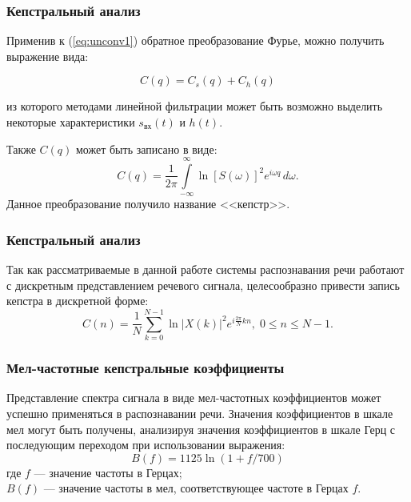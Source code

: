 \documentclass[slidestop, compress, mathserif, blackandwhite, utf8, serif, slidescentered]{beamer}
\begin{document}
\begin{frame}[plain]
	\frametitle{Кепстральный анализ}
	Применив к (\ref{eq:unconv1}) обратное преобразование Фурье, можно получить выражение вида:

	\begin{equation}
		C(q)=C_{s}(q)+C_{h}(q)
	\end{equation}

	из которого методами линейной фильтрации может быть возможно выделить некоторые характеристики $s_{\text{вх}}(t)$ и $h(t)$.

	Также $C(q)$ может быть записано в виде:
	\begin{equation}
		 C(q)={\frac{1}{2\pi}}\int\limits_{-\infty}^{\infty} \ln [S(\omega)]^2 e^{i\omega q}\, d\omega .
	\end{equation}
	Данное преобразование получило название <<кепстр>>.
\end{frame}

\begin{frame}[plain]
	\frametitle{Кепстральный анализ}
	Так как рассматриваемые в данной работе системы распознавания речи работают с дискретным представлением речевого сигнала, целесообразно привести запись кепстра в дискретной форме:
	\begin{equation}
		C(n)=\frac{1}{N}\sum_{k=0}^{N-1}{\ln|{X(k)}|^2e^{i\frac{2\pi}{N}kn}}, \; 0\leq n\leq N-1.
	\end{equation}

\end{frame}	

\begin{frame}[plain]
	\frametitle{Мел-частотные кепстральные коэффициенты}
	Представление спектра сигнала в виде мел-частотных коэффициентов может успешно применяться в распознавании речи. Значения коэффициентов в шкале мел могут быть получены, анализируя значения коэффициентов в шкале Герц с последующим переходом при использовании выражения:
	\begin{equation}
		B(f)=1125\ln(1+f/700)
		\label{eq:mel}
	\end{equation}
	где  $f$ --- значение частоты в Герцах;\\
	$B(f)$ --- значение частоты в мел, соответствующее частоте в Герцах $f$.


\end{frame}
\end{document}
